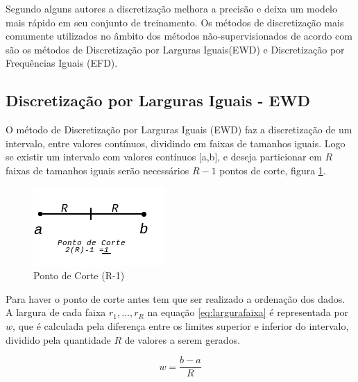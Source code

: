 Segundo alguns autores \cite{Catlett2006,Hwang2002} a discretização melhora a precisão e deixa um modelo mais rápido em seu conjunto de treinamento. Os métodos de discretização mais comumente utilizados no âmbito dos métodos  não-supervisionados de acordo com \cite{Kotsiantis2006, Dougherty1995} são os métodos de Discretização por Larguras Iguais(EWD) e Discretização por Frequências Iguais (EFD).




\subsection{Discretização por Larguras Iguais - EWD}\label{cap:refTeor:subsec:ewd}

O método de Discretização por Larguras Iguais (EWD) faz a discretização de um intervalo, entre valores contínuos, dividindo em faixas de tamanhos iguais. Logo se existir um intervalo com valores contínuos [a,b], e deseja particionar em ${R}$ faixas de tamanhos iguais serão necessários ${R-1}$ pontos de corte, figura \ref{fig:pontocorte}. 

\begin{figure}[h]
        \centering
        \includegraphics[scale=1]{figs/faixaA-B_PontoCorte.png}
        \caption{Ponto de Corte (R-1)} \label{fig:pontocorte}
\end{figure}

Para haver o ponto de corte antes tem que ser realizado a ordenação dos dados. A largura de cada faixa ${r_1,...,r_R}$ na equação \ref{eq:largurafaixa} é representada por ${w}$, que é calculada pela diferença entre os limites superior e inferior do intervalo, dividido pela quantidade ${R}$ de valores a serem gerados.

\begin{equation}
 w = \frac{b-a}{R}
 \label{eq:largurafaixa}
\end{equation}

